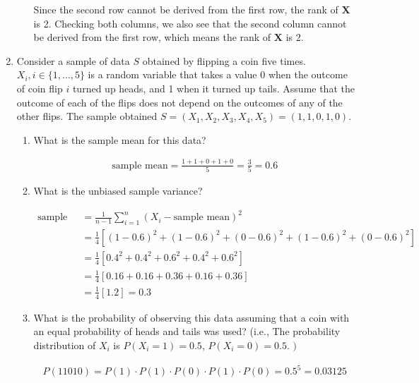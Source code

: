 \documentclass[letterpaper]{article}
\theoremstyle{definition}
\begin{document}
\begin{enumerate}
\begin{enumerate}
\color{teal}
Since the second row cannot be derived from the first row, the rank of \(\mathbf{X}\) is 2.
Checking both columns, we also see that the second column cannot be derived from the first
row, which means the rank of \(\mathbf{X}\) is 2. \\[0pt]
\color{black}
\end{enumerate}

\item Consider a sample of data \(S\) obtained by flipping a coin five times. \(X_{i}, i \in\{1, \ldots, 5\}\) is a random variable that takes a value 0 when the outcome of coin flip \(i\) turned up heads, and 1 when it turned up tails. Assume that the outcome of each of the flips does not depend on the outcomes of any of the other flips. The sample obtained \(S=\left(X_{1}, X_{2}, X_{3}, X_{4}, X_{5}\right)=(1,1,0,1,0)\).

\begin{enumerate}
\item What is the sample mean for this data?

\color{teal}
\begin{align*}
\text{sample mean} = \frac{1 + 1 + 0 + 1 + 0}{5} =\frac{3}{5} = 0.6
\end{align*}
\color{black}

\item What is the unbiased sample variance?

\color{teal}
\begin{align*}
\text{sample variance} &= \frac{1}{n-1} \sum\limits_{i=1}^n (X_i - \text{sample mean})^2 \\
&= \frac14\left[(1 - 0.6)^2 + (1 - 0.6)^2 + (0 - 0.6)^2 + (1 - 0.6)^2 + (0 - 0.6)^2\right] \\
&= \frac14 \left[0.4^2 + 0.4^2 + 0.6^2 + 0.4^2 + 0.6^2 \right] \\
&= \frac14 \left[0.16 + 0.16 + 0.36 + 0.16 + 0.36 \right] \\
&= \frac14 \left[1.2\right] = 0.3
\end{align*}
\color{black}

\item What is the probability of observing this data assuming that a coin with an equal probability of heads and tails was used? (i.e., The probability distribution of \(X_{i}\) is \(P\left(X_{i}=1\right)=0.5\), \(P\left(X_{i}=0\right)=0.5\). \()\)

\color{teal}
\begin{align*}
P(11010) = P(1) \cdot P(1) \cdot P(0) \cdot P(1) \cdot P(0) = 0.5^5 = 0.03125
\end{align*}
\color{black}


\end{enumerate}
\end{enumerate}
\end{document}
